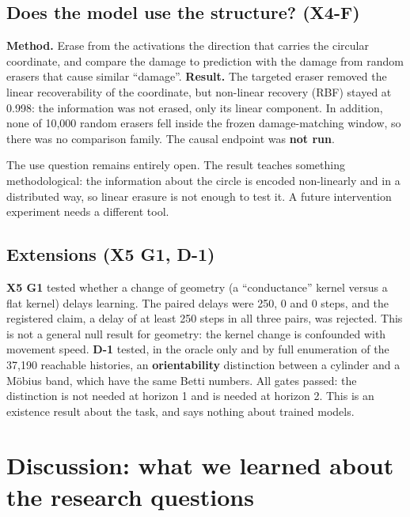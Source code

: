 \documentclass[12pt,a4paper]{article}
\newcommand{\en}[1]{\foreignlanguage{english}{#1}}   %
\newcommand{\chapterbreak}{\clearpage}
\let\oldsection\section
\renewcommand{\section}{\chapterbreak\oldsection}
\begin{document}
\subsection{Does the model use the structure? (\en{X4-F})}
\textbf{Method.} Erase from the activations the direction that carries the circular coordinate, and compare the damage to prediction with the damage from random erasers that cause similar ``damage''. \textbf{Result.} The targeted eraser removed the linear recoverability of the coordinate, but non-linear recovery (\en{RBF}) stayed at 0.998: the information was not erased, only its linear component. In addition, none of 10,000 random erasers fell inside the frozen damage-matching window, so there was no comparison family. The causal endpoint was \textbf{not run}.
\begin{meaningbox}
The use question remains entirely open. The result teaches something methodological: the information about the circle is encoded non-linearly and in a distributed way, so linear erasure is not enough to test it. A future intervention experiment needs a different tool.
\end{meaningbox}

\subsection{Extensions (\en{X5 G1}, \en{D-1})}
\textbf{\en{X5 G1}} tested whether a change of geometry (a ``conductance'' kernel versus a flat kernel) delays learning. The paired delays were 250, 0 and 0 steps, and the registered claim, a delay of at least 250 steps in all three pairs, was rejected. This is not a general null result for geometry: the kernel change is confounded with movement speed. \textbf{\en{D-1}} tested, in the oracle only and by full enumeration of the 37,190 reachable histories, an \textbf{orientability} distinction between a cylinder and a Möbius band, which have the same Betti numbers. All gates passed: the distinction is not needed at horizon 1 and is needed at horizon 2. This is an existence result about the task, and says nothing about trained models.

\section{Discussion: what we learned about the research questions}\label{sec:discussion}
\end{document}
